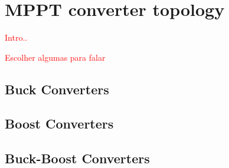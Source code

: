 \section{MPPT converter topology}

\textcolor{red}{Intro..}

\textcolor{red}{Escolher algumas para falar}

\subsection{Buck Converters}

\subsection{Boost Converters}

\subsection{Buck-Boost Converters}


